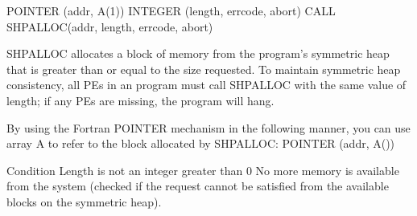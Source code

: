 
\synF   %
POINTER (addr, A(1))
INTEGER (length, errcode, abort)
CALL SHPALLOC(addr, length, errcode, abort)

 {   
 SHPALLOC	 allocates a block of memory from the program's symmetric heap
       that is greater than or equal  to  the  size  requested.	  To  maintain
       symmetric  heap	consistency,  all  \ac{PE}s in an program must call SHPALLOC
       with the same value of length; if any  \ac{PE}s  are
       missing, the program will hang.
       
       By using the Fortran POINTER mechanism in the following manner, you can
       use array A to refer to the block allocated by SHPALLOC: POINTER (addr,
       A())
  }
{
{}
\desR{ }
 {Condition}
 {Length is not an integer greater than 0}
 { No more memory is available from the system (checked  if the  request  cannot  be	satisfied  from	 the available blocks on the symmetric heap).}
}%

\eAPI 
